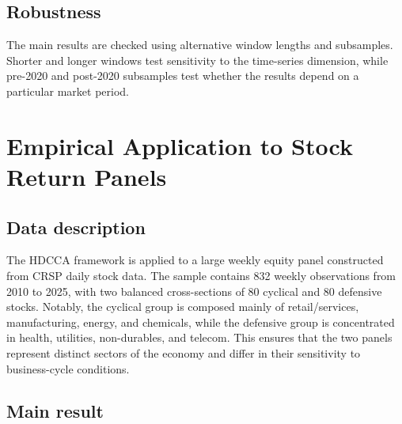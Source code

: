 \documentclass[12pt]{report} %
\begin{document}
\section{Robustness}

The main results are checked using alternative window lengths and subsamples. Shorter and longer windows test 
sensitivity to the time-series dimension, while pre-2020 and post-2020 subsamples test whether the results 
depend on a particular market period. 


\chapter{Empirical Application to Stock Return Panels}
\label{ch:EmpiricalApplication}

\section{Data description}

The HDCCA framework is applied to a large weekly equity panel constructed from CRSP daily stock data. 
The sample contains 832 weekly observations from 2010 to 2025, 
with two balanced cross-sections of 80 cyclical and 80 defensive stocks. 
Notably, the cyclical group is composed mainly of retail/services, manufacturing, 
energy, and chemicals, while the defensive group is concentrated in health, utilities, non-durables, and telecom. 
This ensures that the two panels represent distinct sectors of the economy and differ in their 
sensitivity to business-cycle conditions.


\section{Main result}
\end{document}
